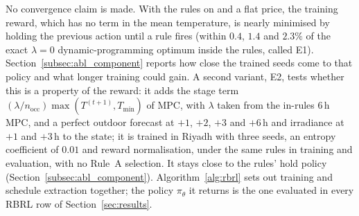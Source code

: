 \documentclass[3p,twocolumn,number]{elsarticle}
\newcommand{\Tmin}{T_{\min}}
\begin{document}
No convergence claim is made. With the rules on and a flat price, the training reward, which has no term in the mean temperature, is nearly minimised by holding the previous action until a rule fires (within $0.4$, $1.4$ and $2.3\%$ of the exact $\lambda=0$ dynamic-programming optimum inside the rules, called E1). Section~\ref{subsec:abl_component} reports how close the trained seeds come to that policy and what longer training could gain. A second variant, E2, tests whether this is a property of the reward: it adds the stage term $(\lambda/n_{\mathrm{occ}})\max(T^{(t+1)},\Tmin)$ of MPC, with $\lambda$ taken from the in-rules $6\,$h MPC, and a perfect outdoor forecast at $+1$, $+2$, $+3$ and $+6\,$h and irradiance at $+1$ and $+3\,$h to the state; it is trained in Riyadh with three seeds, an entropy coefficient of $0.01$ and reward normalisation, under the same rules in training and evaluation, with no Rule~A selection. It stays close to the rules' hold policy (Section~\ref{subsec:abl_component}). Algorithm~\ref{alg:rbrl} sets out training and schedule extraction together; the policy $\pi_\theta$ it returns is the one evaluated in every RBRL row of Section~\ref{sec:results}.
 
\end{document}
